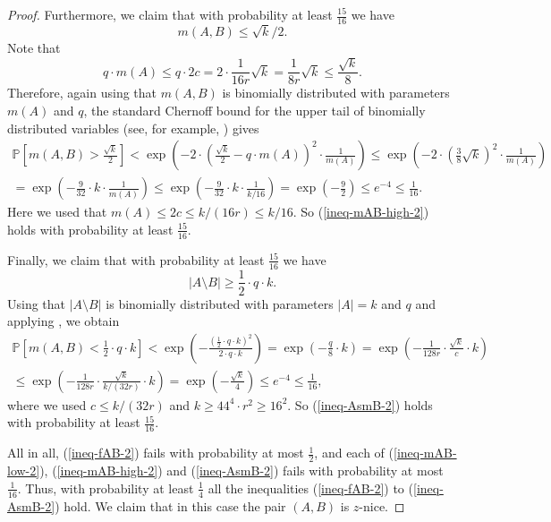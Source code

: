 \documentclass[11pt]{article}
\theoremstyle{definition}
\numberwithin{equation}{section}
\begin{document}
\begin{proof}
Furthermore, we claim that with probability at least $\frac{15}{16}$ we have
\begin{equation}\label{ineq-mAB-high-2}
m(A,B)\leq \sqrt{k}/2.
\end{equation}
Note that
\[q\cdot m(A)\leq q\cdot 2c=2\cdot \frac{1}{16r}\sqrt{k}=\frac{1}{8r}\sqrt{k}\leq \frac{\sqrt{k}}{8}.\]
Therefore, again using that $m(A,B)$ is binomially distributed with parameters $m(A)$ and $q$, the standard Chernoff bound for the upper tail of binomially distributed variables (see, for example, \cite[Theorem A.1.4]{alon-spencer}) gives
\begin{multline*}
\mathbb{P}\left[m(A,B)> \frac{\sqrt{k}}{2}\right]<\exp\left(-2\cdot \left(\frac{\sqrt{k}}{2}-q\cdot m(A)\right)^2\cdot \frac{1}{m(A)}\right)\leq \exp\left(-2\cdot \left(\frac{3}{8}\sqrt{k}\right)^2\cdot \frac{1}{m(A)}\right)\\
=\exp\left(-\frac{9}{32}\cdot k\cdot \frac{1}{m(A)}\right)\leq \exp\left(-\frac{9}{32}\cdot k\cdot \frac{1}{k/16}\right)=\exp\left(-\frac{9}{2}\right)\leq e^{-4}\leq \frac{1}{16}.
\end{multline*}
Here we used that $m(A)\leq 2c\leq k/(16r)\leq k/16$. So (\ref{ineq-mAB-high-2}) holds with probability at least $\frac{15}{16}$.

Finally, we claim that with probability at least $\frac{15}{16}$ we have
\begin{equation}\label{ineq-AsmB-2}
\vert A\setminus B\vert\geq \frac{1}{2}\cdot q \cdot k.
\end{equation}
Using that $\vert A\setminus B\vert$ is binomially distributed with parameters $\vert A\vert=k$ and $q$ and applying \cite[Theorem A.1.13]{alon-spencer}, we obtain
\begin{multline*}
\mathbb{P}\left[m(A,B)< \frac{1}{2}\cdot q \cdot k\right]<\exp\left(-\frac{\left(\frac{1}{2}\cdot q \cdot k\right)^2}{2\cdot q\cdot k}\right)=\exp\left(-\frac{q}{8}\cdot k\right)=\exp\left(-\frac{1}{128r}\cdot \frac{\sqrt{k}}{c}\cdot k\right)\\
\leq \exp\left(-\frac{1}{128r}\cdot \frac{\sqrt{k}}{k/(32r)}\cdot k\right)=\exp\left(-\frac{\sqrt{k}}{4}\right)\leq e^{-4}\leq \frac{1}{16},
\end{multline*}
where we used $c\leq k/(32r)$ and $k\geq 44^4 \cdot r^2\geq 16^2$. So (\ref{ineq-AsmB-2}) holds with probability at least $\frac{15}{16}$.

All in all, (\ref{ineq-fAB-2}) fails with probability at most $\frac{1}{2}$,  and each of (\ref{ineq-mAB-low-2}), (\ref{ineq-mAB-high-2}) and  (\ref{ineq-AsmB-2}) fails with probability at most $\frac{1}{16}$. Thus, with probability at least $\frac{1}{4}$ all the inequalities (\ref{ineq-fAB-2}) to (\ref{ineq-AsmB-2}) hold. We claim that in this case the pair $(A,B)$ is $z$-nice.


\end{proof}
\end{document}
